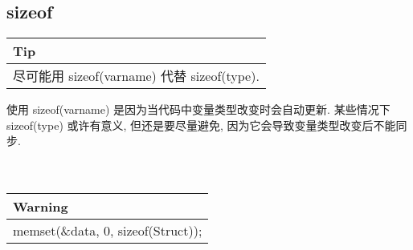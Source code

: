 \documentclass[a4paper,11pt,CJK]{article}
\begin{document}
\begin{CJK}{UTF8}{gbsn}
\subsection{sizeof}
\begin{table}[htbp]
\flushleft
\begin{tabular}{p{400pt}}
\toprule
\rowcolor[gray]{.8} Tip \\
\midrule
尽可能用 sizeof(varname) 代替 sizeof(type).\\
\bottomrule
\end{tabular}
\end{table}
使用 sizeof(varname) 是因为当代码中变量类型改变时会自动更新. 某些情况下 sizeof(type) 或许有意义, 但还是要尽量避免, 因为它会导致变量类型改变后不能同步.\\
\\
\\
\begin{table}[htbp]
\flushleft
\begin{tabular}{p{400pt}}
\toprule
\rowcolor{red} Warning \\
\midrule
memset(\&data, 0, sizeof(Struct));
\\
\bottomrule
\end{tabular}
\end{table}

\end{CJK}
\end{document}
